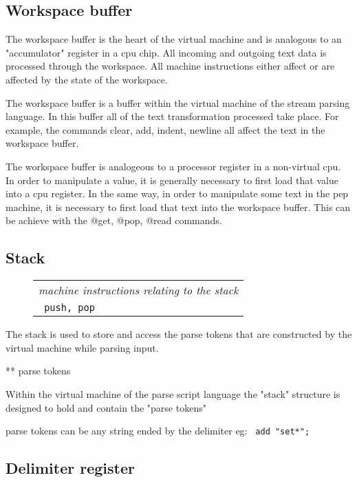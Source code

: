 \documentclass[a4paper,12pt]{article}
\begin{document}
\subsection{Workspace buffer}

  The workspace buffer is the heart of the virtual machine and is
  analogous to an "accumulator" register in a cpu chip. All incoming
  and outgoing text data is processed through the workspace. All machine
  instructions either affect or are affected by the state of the
  workspace.

  The workspace buffer is a buffer within the virtual machine of
  the stream parsing language. In this buffer all of the text
  transformation processed take place. For example, the commands
  clear, add, indent, newline all affect the text in the
  workspace buffer.

  The workspace buffer is analogeous to a processor register
  in a non-virtual cpu. In order to manipulate a value, it is
  generally necessary to first load that value into a
  cpu register. In the same way, in order to manipulate some
  text in the pep machine, it is necessary to first
  load that text into the workspace buffer. This can be
  achieve with the @get, @pop, @read commands.

\subsection{Stack}
 \begin{figure}
 \begin{tabular}{ l }
 \emph{ machine instructions relating to the stack } \\ 
 \verb| push, pop |
 \end{tabular} 
 \end{figure}

  The stack is used to store and access the parse tokens that are constructed
  by the virtual machine while parsing input.

** parse tokens

 Within the virtual machine of the parse script language the "stack"
 structure is designed to hold and contain the "parse tokens"
 
 parse tokens can be any string ended by the delimiter eg: 
 \verb| add "set*"; |


\subsection{Delimiter register}
\end{document}
